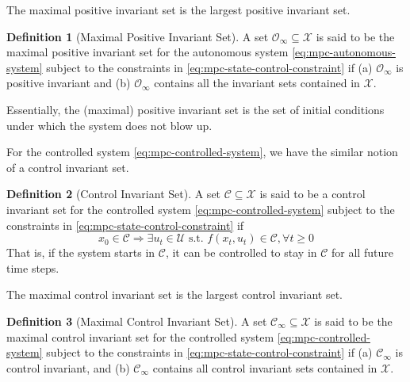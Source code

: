 \documentclass[
]{book}
\theoremstyle{definition}
\newtheorem{definition}{Definition}[chapter]
\theoremstyle{definition}
\theoremstyle{definition}
\theoremstyle{definition}
\theoremstyle{remark}
\begin{document}
The maximal positive invariant set is the largest positive invariant set.

\begin{definition}[Maximal Positive Invariant Set]
\protect\hypertarget{def:maximal-positive-invariant-set}{}\label{def:maximal-positive-invariant-set}A set \(\mathcal{O}_{\infty} \subseteq \mathcal{X}\) is said to be the maximal positive invariant set for the autonomous system \eqref{eq:mpc-autonomous-system} subject to the constraints in \eqref{eq:mpc-state-control-constraint} if (a) \(\mathcal{O}_{\infty}\) is positive invariant and (b) \(\mathcal{O}_{\infty}\) contains all the invariant sets contained in \(\mathcal{X}\).
\end{definition}

Essentially, the (maximal) positive invariant set is the set of initial conditions under which the system does not blow up.

For the controlled system \eqref{eq:mpc-controlled-system}, we have the similar notion of a control invariant set.

\begin{definition}[Control Invariant Set]
\protect\hypertarget{def:control-invariant-set}{}\label{def:control-invariant-set}A set \(\mathcal{C} \subseteq \mathcal{X}\) is said to be a control invariant set for the controlled system \eqref{eq:mpc-controlled-system} subject to the constraints in \eqref{eq:mpc-state-control-constraint} if
\[
x_0 \in \mathcal{C} \Longrightarrow \exists u_t \in \mathcal{U} \text{ s.t. } f(x_t,u_t) \in \mathcal{C}, \forall t \geq 0
\]
That is, if the system starts in \(\mathcal{C}\), it can be controlled to stay in \(\mathcal{C}\) for all future time steps.
\end{definition}

The maximal control invariant set is the largest control invariant set.

\begin{definition}[Maximal Control Invariant Set]
\protect\hypertarget{def:maximal-control-invariant-set}{}\label{def:maximal-control-invariant-set}A set \(\mathcal{C}_{\infty} \subseteq \mathcal{X}\) is said to be the maximal control invariant set for the controlled system \eqref{eq:mpc-controlled-system} subject to the constraints in \eqref{eq:mpc-state-control-constraint} if (a) \(\mathcal{C}_{\infty}\) is control invariant, and (b) \(\mathcal{C}_{\infty}\) contains all control invariant sets contained in \(\mathcal{X}\).
\end{definition}
\end{document}
